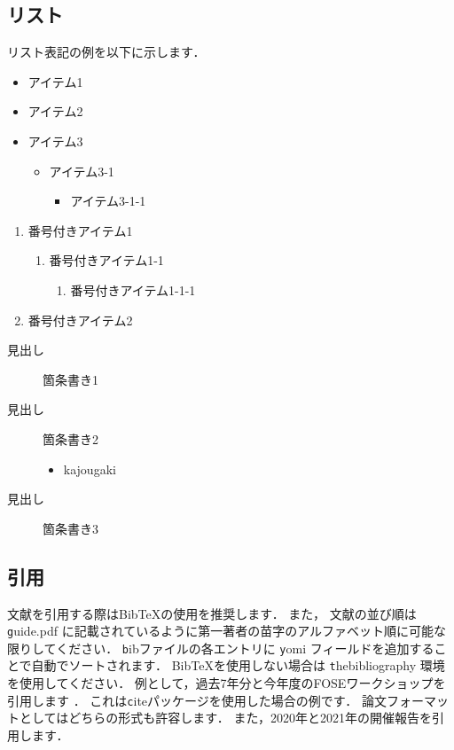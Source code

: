 \documentclass[T,J]{fose} %
\begin{document}
\subsection{リスト}

リスト表記の例を以下に示します．

\begin{itemize}
	\item アイテム1
	\item アイテム2
	\item アイテム3
	\begin{itemize}
		\item アイテム3-1
		\begin{itemize}
			\item アイテム3-1-1
		\end{itemize}
	\end{itemize}
\end{itemize}

\newpage

\begin{enumerate}
	\item 番号付きアイテム1
	\begin{enumerate}
		\item 番号付きアイテム1-1
		\begin{enumerate}
			\item 番号付きアイテム1-1-1
		\end{enumerate}
	\end{enumerate}
	\item 番号付きアイテム2
\end{enumerate}

\begin{description}
	\item[見出し] 箇条書き1
	\item[見出し] 箇条書き2
		\begin{itemize}
			\item kajougaki
		\end{itemize}
	\item[見出し] 箇条書き3
 \end{description}
 
\subsection{引用}
文献を引用する際はBibTeXの使用を推奨します．
また， 文献の並び順は{\texttt guide.pdf} に記載されているように第一著者の苗字のアルファベット順に可能な限りしてください．
{\texttt bib}ファイルの各エントリに {\texttt yomi} フィールドを追加することで自動でソートされます．
BibTeXを使用しない場合は {\texttt thebibliography} 環境を使用してください．
例として，過去7年分と今年度のFOSEワークショップを引用します
\cite{fose2015}
\cite{fose2016}
\cite{fose2017}
\cite{fose2018}
\cite{fose2019}
\cite{fose2020}
\cite{fose2021}
\cite{fose2022}
\cite{fose2023}
．
これは{\texttt cite}パッケージを使用した場合の例です\cite{fose2015,fose2016,fose2017,fose2018,fose2019,fose2020,fose2021,fose2022,fose2023}．
論文フォーマットとしてはどちらの形式も許容します．
また，2020年と2021年の開催報告を引用します\cite{fose2020report}\cite{fose2021report}．
\end{document}
